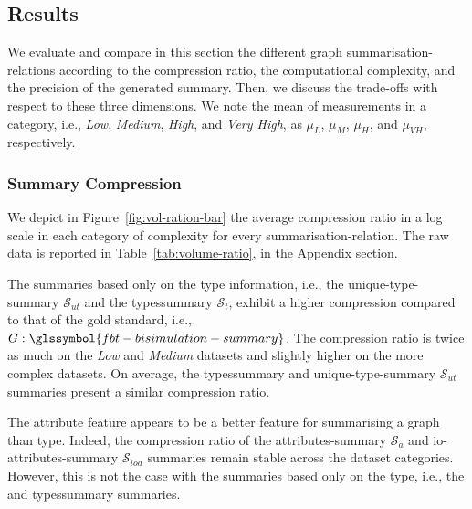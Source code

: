 

\subsection{Results}
\label{sec:eval:results}

We evaluate and compare in this section the different graph \glspl{summarisation-relation} according to the compression ratio, the computational complexity, and the precision of the generated summary. Then, we discuss the trade-offs with respect to these three dimensions.
We note the mean of measurements in a category, i.e., \emph{Low}, \emph{Medium}, \emph{High}, and \emph{Very High}, as $\mu_{L}$, $\mu_{M}$, $\mu_{H}$, and $\mu_{VH}$, respectively.

\subsubsection{Summary Compression}

We depict in Figure~\ref{fig:vol-ration-bar} the average compression ratio in a log scale in each category of complexity for every \gls{summarisation-relation}. The raw data is reported in Table~\ref{tab:volume-ratio}, in the Appendix section.

The summaries based only on the type information, i.e., the \gls{unique-type-summary} $\mathcal{S}_{ut}$ and the \gls{typessummary} $\mathcal{S}_t$, exhibit a higher compression compared to that of the gold standard, i.e., $G:\glssymbol{fbt-bisimulation-summary}$. The compression ratio is twice as much on the \emph{Low} and \emph{Medium} datasets and slightly higher on the more complex datasets. On average, the \gls{typessummary} and  \gls{unique-type-summary} $\mathcal{S}_{ut}$ summaries present a similar compression ratio.

The attribute feature appears to be a better feature for summarising a graph than type. Indeed, the compression ratio of the \gls{attributes-summary} $\mathcal{S}_{a}$ and \gls{io-attributes-summary} $\mathcal{S}_{ioa}$ summaries remain stable across the dataset categories. However, this is not the case with the summaries based only on the type, i.e., the  and \gls{typessummary} summaries.

